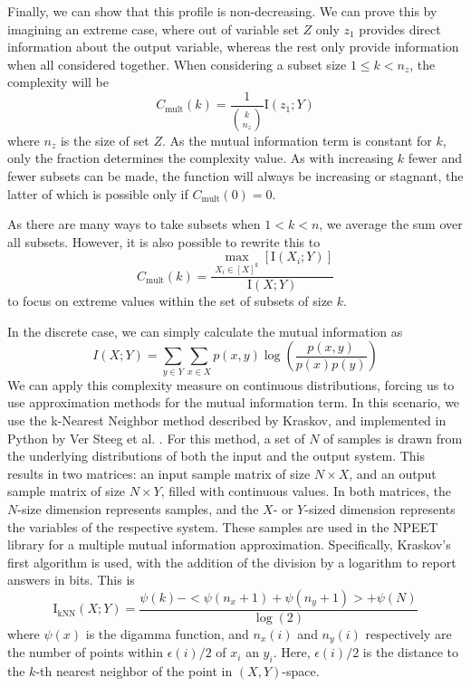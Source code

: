 \documentclass[../main.tex]{subfiles}
\begin{document}
Finally, we can show that this profile is non-decreasing.
We can prove this by imagining an extreme case, where out of variable set $Z$ only $z_1$ provides direct information about the output variable, whereas the rest only provide information when all considered together.
When considering a subset size $1 \le k < n_z $, the complexity will be
%
\begin{equation}
C_\mathrm{mult}(k) = \frac{1}{\binom{k}{n_z}} \mathrm{I}(z_1;Y)
\end{equation}
%
where $n_z$ is the size of set $Z$.
As the mutual information term is constant for $k$, only the fraction determines the complexity value.
As with increasing $k$ fewer and fewer subsets can be made, the function will always be increasing or stagnant, the latter of which is possible only if $C_\mathrm{mult}(0) = 0$.

As there are many ways to take subsets when $1 < k < n$, we average the sum over all subsets.
However, it is also possible to rewrite this to
%
\begin{equation}
C_\mathrm{mult}(k) = \frac{\max_{X_i \in [X]^k} [\mathrm{I}(X_i;Y)]}{\mathrm{I}(X;Y)}
\end{equation}
%
to focus on extreme values within the set of subsets of size $k$.

In the discrete case, we can simply calculate the mutual information as
%
\begin{equation}
	I(X;Y) = \sum_{y \in Y} \sum_{x \in X} p(x,y) \log (\frac{p(x,y)}{p(x)p(y)})
\end{equation}
%
We can apply this complexity measure on continuous distributions, forcing us to use approximation methods for the mutual information term.
In this scenario, we use the k-Nearest Neighbor method described by Kraskov, and implemented in Python by Ver Steeg et al. \cite{kraskov2004estimating, versteeg2013NPEET}.
For this method, a set of $N$ of samples is drawn from the underlying distributions of both the input and the output system.
This results in two matrices: an input sample matrix of size $N \times X$, and an output sample matrix of size $N \times Y$, filled with continuous values.
In both matrices, the $N$-size dimension represents samples, and the $X$- or $Y$-sized dimension represents the variables of the respective system.
These samples are used in the NPEET library for a multiple mutual information approximation.
Specifically, Kraskov's first algorithm is used, with the addition of the division by a logarithm to report answers in bits.
This is
%
\begin{equation}
\mathrm{I}_\mathrm{kNN}(X;Y) = \frac{\psi(k) - < \psi(n_x + 1) + \psi(n_y + 1) > + \psi(N)}{\log(2)}
\end{equation}
%
where $\psi(x)$ is the digamma function, and $n_x(i)$ and $n_y(i)$ respectively are the number of points within $\epsilon(i)/2$ of $x_i$ an $y_i$. Here, $\epsilon(i)/2$ is the distance to the $k$-th nearest neighbor of the point in $(X,Y)$-space.
\end{document}
